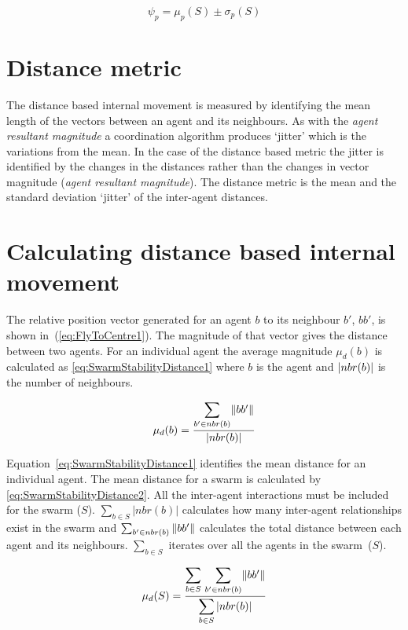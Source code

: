 \begin{equation}
\label{eq:SwarmPotentialMagnitude}
\psi_p = \mu_p(S)\pm \sigma_p(S)
\end{equation}

\section{Distance metric}
The distance based internal movement is measured by identifying the mean length of the vectors between an agent and its neighbours. As with the \textit{agent resultant magnitude} a coordination algorithm produces `jitter' which is the variations from the mean. In the case of the distance based metric the jitter is identified by the changes in the distances rather than the changes in vector magnitude (\textit{agent resultant magnitude}). The distance metric is the mean and the standard deviation `jitter' of the inter-agent distances.

\section{Calculating distance based internal movement}
The relative position vector generated for an agent $b$ to its neighbour $b'$, $bb'$, is shown in~(\autoref{eq:FlyToCentre1}). The magnitude of that vector gives the distance between two agents. For an individual agent the average magnitude $\mu_d(b)$ is calculated as \autoref{eq:SwarmStabilityDistance1} where $b$ is the agent and $\vert{nbr(b)}\vert$ is the number of neighbours.

\begin{equation}
\label{eq:SwarmStabilityDistance1}
\mu_d(b) = \frac{\mathlarger{\sum_{b' \in nbr(b)}}\magn{bb'}}{\mathlarger{\card{nbr(b)}}}
\end{equation}

Equation~\ref{eq:SwarmStabilityDistance1} identifies the mean distance for an individual agent. The mean distance for a swarm is calculated by \autoref{eq:SwarmStabilityDistance2}. All the inter-agent interactions must be included for the swarm ($S$). $\sum_{b \in S}|nbr(b)|$ calculates how many inter-agent relationships exist in the swarm and $\sum_{b' \in nbr(b)}\Vert{bb'}\Vert$ calculates the total distance between each agent and its neighbours. $\sum_{b \in S}$ iterates over all the agents in the swarm~($S$).

\begin{equation}
\label{eq:SwarmStabilityDistance2}
\mu_d(S) = \frac{\mathlarger{\sum_{b \in S}}~\mathlarger{\sum_{b' \in nbr(b)}}\magn{bb'}}{\mathlarger{\sum_{b \in S}\card{nbr(b)}}}
\end{equation}

